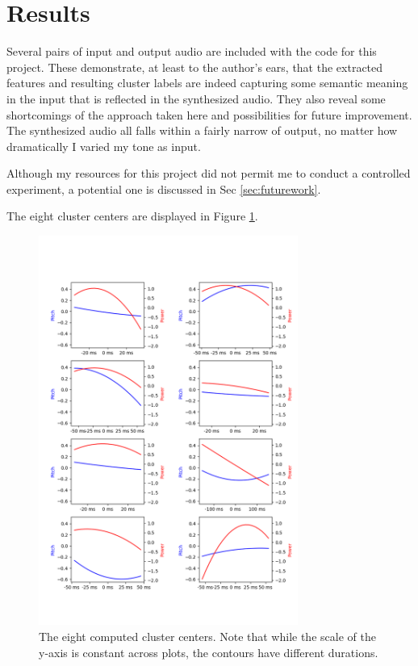 \documentclass{article}
\begin{document}
\section{Results}
\label{sec:results}

Several pairs of input and output audio are included with the code for this project.
These demonstrate, at least to the author's ears, that the extracted features and resulting cluster labels are indeed capturing some semantic meaning in the input that is reflected in the synthesized audio.
They also reveal some shortcomings of the approach taken here and possibilities for future improvement.
The synthesized audio all falls within a fairly narrow of output, no matter how dramatically I varied my tone as input.

Although my resources for this project did not permit me to conduct a controlled experiment, a potential one is discussed in Sec \ref{sec:futurework}.



The eight cluster centers are displayed in Figure \ref{fig:clustercenters}.

\begin{figure}[htb]

\begin{minipage}[b]{1.0\linewidth}
  \centering
  \centerline{\includegraphics[width=8.5cm]{cluster_centers.png}}
\end{minipage}
\caption{The eight computed cluster centers. Note that while the scale of the y-axis is constant across plots, the contours have different durations.}
\label{fig:clustercenters}
\end{figure}
\end{document}
